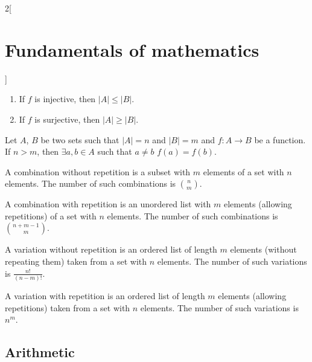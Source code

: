 \documentclass[../../../main.tex]{subfiles}
\begin{document}
\begin{multicols}{2}[\section{Fundamentals of mathematics}]
\begin{corollary}
    \begin{enumerate}
        \item If $f$ is injective, then $|A|\leq|B|$.
        \item If $f$ is surjective, then $|A|\geq|B|$.
    \end{enumerate}
\end{corollary}
\begin{theorem}
    Let $A$, $B$ be two sets such that $|A|=n$ and $|B|=m$ and $f:A\rightarrow B$ be a function. If $n>m$, then $\exists a,b\in A$ such that $a\ne b$ $f(a)=f(b)$.
\end{theorem}
\begin{prop}
    A combination without repetition is a subset with $m$ elements of a set with $n$ elements. The number of such combinations is $\binom{n}{m}$.
\end{prop}
\begin{prop}
    A combination with repetition is an unordered list with $m$ elements (allowing repetitions) of a set with $n$ elements. The number of such combinations is  $\binom{n+m-1}{m}$.
\end{prop}
\begin{prop}
    A variation without repetition is an ordered list of length $m$ elements (without repeating them) taken from a set with $n$ elements. The number of such variations is $\frac{n!}{(n-m)!}$.
\end{prop}
\begin{prop}
    A variation with repetition is an ordered list of length $m$ elements (allowing repetitions) taken from a set with $n$ elements. The number of such variations is $n^m$.
\end{prop}
\subsection{Arithmetic}

\end{multicols}
\end{document}
